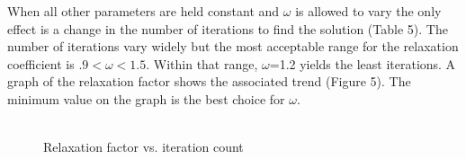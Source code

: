 \documentclass[titlepage,12pt]{article}
\begin{document}
\break When all other parameters are held constant and $\omega$ is
allowed to vary the only effect is a change in the number of
iterations to find the solution (Table 5). The number of iterations
vary widely but the most acceptable range for the relaxation
coefficient is $.9<\omega<1.5$.  Within that range, $\omega$=1.2
yields the least iterations. A graph of the relaxation factor shows
the associated trend (Figure 5). The minimum value on the graph is
the best choice for $\omega$.
\\
\\
\begin{figure}[h]
  \begin{center}
    \caption{Relaxation factor vs. iteration count}
  \end{center}
\end{figure}
\end{document}
